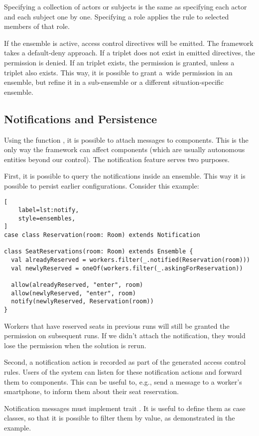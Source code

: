 Specifying a collection of actors or subjects is the same as specifying each actor and
each subject one by one. Specifying a role applies the rule to selected members of that
role.

If the ensemble is active, access control directives will be emitted. The framework
takes a default-deny approach. If a triplet does not exist in emitted directives, the
permission is denied. If an  triplet exists, the permission is granted, unless
a  triplet also exists. This way, it is possible to grant a~wide permission in
an ensemble, but refine it in a sub-ensemble or a different situation-specific ensemble.


\subsection{Notifications and Persistence}
\label{dsl:c:notifications}

Using the function , it is possible to attach messages to components. This is
the only way the framework can affect components (which are usually autonomous entities
beyond our control). The notification feature serves two purposes.

First, it is possible to query the notifications inside an ensemble. This way it is
possible to persist earlier configurations. Consider this example:

\begin{lstlisting}[
    label=lst:notify,
    style=ensembles,
]
case class Reservation(room: Room) extends Notification

class SeatReservations(room: Room) extends Ensemble {
  val alreadyReserved = workers.filter(_.notified(Reservation(room)))
  val newlyReserved = oneOf(workers.filter(_.askingForReservation))

  allow(alreadyReserved, "enter", room)
  allow(newlyReserved, "enter", room)
  notify(newlyReserved, Reservation(room))
}
\end{lstlisting}

Workers that have reserved seats in previous runs will still be granted the 
permission on subsequent runs. If we didn't attach the notification, they would lose the
permission when the solution is rerun.

Second, a notification action is recorded as part of the generated access control rules.
Users of the system can listen for these notification actions and forward them to
components. This can be useful to, e.g., send a message to a worker's smartphone, to
inform them about their seat reservation.

Notification messages must implement trait . It is useful to define
them as case classes, so that it is possible to filter them by value, as demonstrated in
the example.

